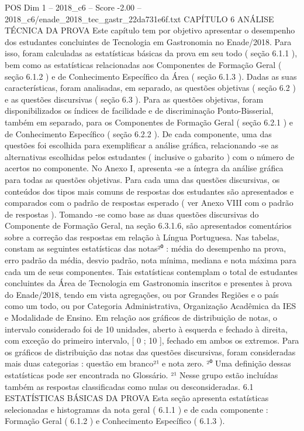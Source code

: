 \begin{textsample}{POS Dim 1 – 2018\_c6 – Score -2.00 – 2018\_c6/enade\_2018\_tec\_gastr\_22da731e6f.txt}  \label{ex:f1_pos_243}
CAPÍTULO 6 ANÁLISE TÉCNICA DA PROVA Este capítulo tem por objetivo apresentar o desempenho dos estudantes concluintes de Tecnologia em Gastronomia no Enade/2018.
Para isso, foram calculadas as estatísticas básicas da prova em seu todo ( seção 6.1.1 ), bem como as estatísticas relacionadas aos Componentes de Formação Geral ( seção 6.1.2 ) e de Conhecimento Específico da Área ( seção 6.1.3 ).
Dadas as suas características, foram analisadas, em separado, as questões objetivas ( seção 6.2 ) e as questões discursivas ( seção 6.3 ).
Para as questões objetivas, foram disponibilizados os índices de facilidade e de discriminação Ponto-Bisserial, também em separado, para os Componentes de Formação Geral ( seção 6.2.1 ) e de Conhecimento Específico ( seção 6.2.2 ).
De cada componente, uma das questões foi escolhida para exemplificar a análise gráfica, relacionando -se as alternativas escolhidas pelos estudantes ( inclusive o gabarito ) com o número de acertos no componente.
No Anexo I, apresenta -se a íntegra da análise gráfica para todas as questões objetivas.
Para cada uma das questões discursivas, os conteúdos dos tipos mais comuns de respostas dos estudantes são apresentados e comparados com o padrão de respostas esperado ( ver Anexo VIII com o padrão de respostas ).
Tomando -se como base as duas questões discursivas do Componente de Formação Geral, na seção 6.3.1.6, são apresentados comentários sobre a correção das respostas em relação à Língua Portuguesa.
Nas tabelas, constam as seguintes estatísticas das notas²⁰ : média do desempenho na prova, erro padrão da média, desvio padrão, nota mínima, mediana e nota máxima para cada um de seus componentes.
Tais estatísticas contemplam o total de estudantes concluintes da Área de Tecnologia em Gastronomia inscritos e presentes à prova do Enade/2018, tendo em vista agregações, ou por Grandes Regiões e o país como um todo, ou por Categoria Administrativa, Organização Acadêmica da IES e Modalidade de Ensino.
Em relação aos gráficos de distribuição de notas, o intervalo considerado foi de 10 unidades, aberto à esquerda e fechado à direita, com exceção do primeiro intervalo, [ 0 ; 10 ], fechado em ambos os extremos.
Para os gráficos de distribuição das notas das questões discursivas, foram consideradas mais duas categorias : questão em branco²¹ e nota zero. ²⁰ Uma definição dessas estatísticas pode ser encontrada no Glossário. ²¹ Nesse grupo estão incluídas também as respostas classificadas como nulas ou desconsideradas. 6.1 ESTATÍSTICAS BÁSICAS DA PROVA Esta seção apresenta estatísticas selecionadas e histogramas da nota geral ( 6.1.1 ) e de cada componente : Formação Geral ( 6.1.2 ) e Conhecimento Específico ( 6.1.3 ).

\end{textsample}
